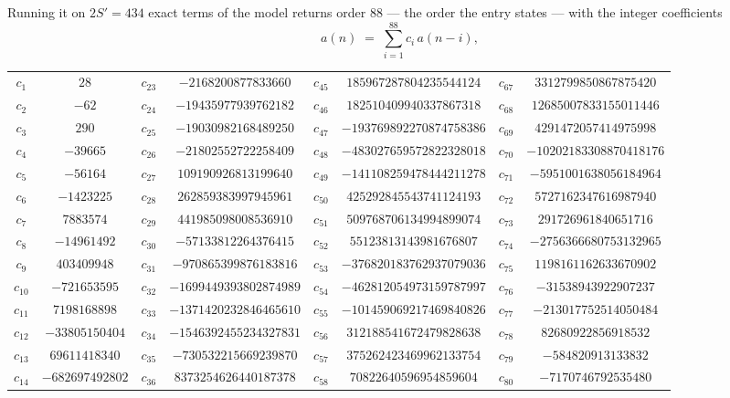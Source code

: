 \documentclass[11pt,a4paper]{article}
\theoremstyle{plain}
\theoremstyle{definition}
\begin{document}
Running it on $2S'=434$ exact terms of the model returns order $88$ --- the order the
entry states --- with the integer coefficients
\[
a(n)\;=\;\sum_{i=1}^{88}c_i\,a(n-i),
\]
\begin{center}\small
\begin{tabular}{cccccccc}
$c_{1}$ & $28$ & $c_{23}$ & $-2168200877833660$ & $c_{45}$ & $185967287804235544124$ & $c_{67}$ & $3312799850867875420$ \\
$c_{2}$ & $-62$ & $c_{24}$ & $-19435977939762182$ & $c_{46}$ & $182510409940337867318$ & $c_{68}$ & $12685007833155011446$ \\
$c_{3}$ & $290$ & $c_{25}$ & $-19030982168489250$ & $c_{47}$ & $-193769892270874758386$ & $c_{69}$ & $4291472057414975998$ \\
$c_{4}$ & $-39665$ & $c_{26}$ & $-21802552722258409$ & $c_{48}$ & $-483027659572822328018$ & $c_{70}$ & $-10202183308870418176$ \\
$c_{5}$ & $-56164$ & $c_{27}$ & $109190926813199640$ & $c_{49}$ & $-141108259478444211278$ & $c_{71}$ & $-5951001638056184964$ \\
$c_{6}$ & $-1423225$ & $c_{28}$ & $262859383997945961$ & $c_{50}$ & $425292845543741124193$ & $c_{72}$ & $5727162347616987940$ \\
$c_{7}$ & $7883574$ & $c_{29}$ & $441985098008536910$ & $c_{51}$ & $509768706134994899074$ & $c_{73}$ & $291726961840651716$ \\
$c_{8}$ & $-14961492$ & $c_{30}$ & $-57133812264376415$ & $c_{52}$ & $55123813143981676807$ & $c_{74}$ & $-2756366680753132965$ \\
$c_{9}$ & $403409948$ & $c_{31}$ & $-970865399876183816$ & $c_{53}$ & $-376820183762937079036$ & $c_{75}$ & $1198161162633670902$ \\
$c_{10}$ & $-721653595$ & $c_{32}$ & $-1699449393802874989$ & $c_{54}$ & $-462812054973159787997$ & $c_{76}$ & $-31538943922907237$ \\
$c_{11}$ & $7198168898$ & $c_{33}$ & $-1371420232846465610$ & $c_{55}$ & $-101459069217469840826$ & $c_{77}$ & $-213017752514050484$ \\
$c_{12}$ & $-33805150404$ & $c_{34}$ & $-1546392455234327831$ & $c_{56}$ & $312188541672479828638$ & $c_{78}$ & $82680922856918532$ \\
$c_{13}$ & $69611418340$ & $c_{35}$ & $-730532215669239870$ & $c_{57}$ & $375262423469962133754$ & $c_{79}$ & $-584820913133832$ \\
$c_{14}$ & $-682697492802$ & $c_{36}$ & $8373254626440187378$ & $c_{58}$ & $70822640596954859604$ & $c_{80}$ & $-7170746792535480$ \\

\end{tabular}
\end{center}
\end{document}
